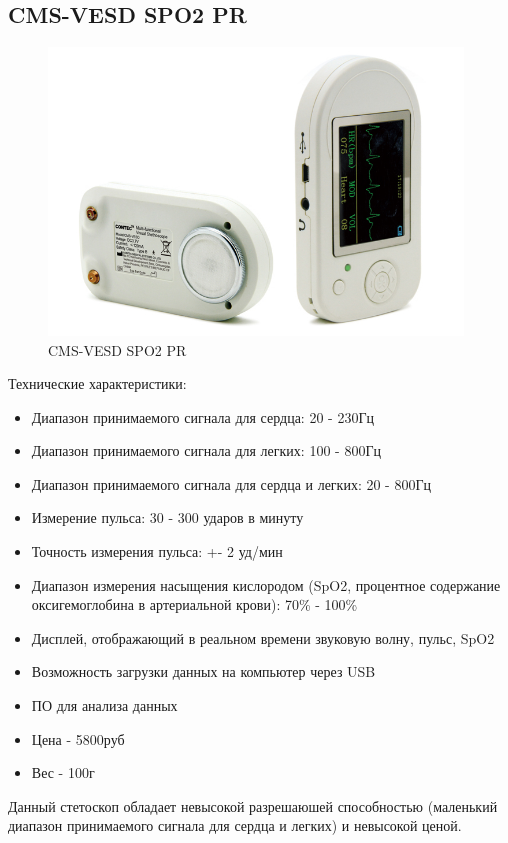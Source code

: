 \documentclass[../paper.tex]{subfiles}
\begin{document}
\subsection{CMS-VESD SPO2 PR}
\begin{figure}[H]
\centering
\includegraphics[width=11cm]{images/cms-vesd.jpg}
\caption{CMS-VESD SPO2 PR}
\end{figure}

Технические характеристики:\cite{cms-vesd}
\begin{itemize}
  \item Диапазон принимаемого сигнала для сердца: 20 - 230Гц
  \item Диапазон принимаемого сигнала для легких: 100 - 800Гц
  \item Диапазон принимаемого сигнала для сердца и легких: 20 - 800Гц
  \item Измерение пульса: 30 - 300 ударов в минуту
  \item Точность измерения пульса: +- 2 уд/мин
  \item Диапазон измерения насыщения кислородом (SpO2, процентное содержание оксигемоглобина в артериальной крови): 70\% - 100\%
  \item Дисплей, отображающий в реальном времени звуковую волну, пульс, SpO2
  \item Возможность загрузки данных на компьютер через USB
  \item ПО для анализа данных
  \item Цена - 5800руб
  \item Вес - 100г
\end{itemize}

Данный стетоскоп обладает невысокой разрешаюшей способностью (маленький диапазон принимаемого сигнала для сердца и легких) и невысокой ценой.
\end{document}
